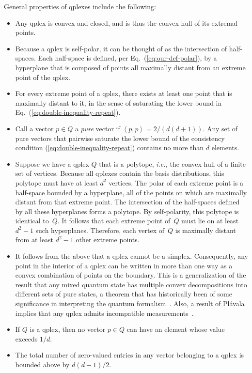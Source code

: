 \documentclass[aps,pra,superscriptaddress,10pt,tightenlines,twocolumn,nofootinbib]{revtex4}
\theoremstyle{remark}
\newcommand{\qp}{Q}
\newcommand{\inprod}[2]{{\left\langle #1 , #2 \right\rangle}}
\begin{document}
General properties of qplexes include the following:
\begin{itemize}
\item Any qplex is convex and closed, and is thus the convex hull of
  its extremal points.

\item Because a qplex is self-polar, it can be thought of as the
  intersection of half-spaces.  Each half-space is defined, per
  Eq.~(\ref{eq:our-def-polar}), by a hyperplane that is composed of
  points all maximally distant from an extreme point of the qplex.

\item For every extreme point of a qplex, there exists at least one
  point that is maximally distant to it, in the sense of saturating
  the lower bound in Eq.~(\ref{eq:double-inequality-repeat}).

\item Call a vector ${p} \in \qp$ a \emph{pure} vector if
  $\inprod{p}{p} = 2/(d(d+1))$.  Any set of pure vectors that pairwise
  saturate the lower bound of the consistency condition
  (\ref{eq:double-inequality-repeat}) contains no more than $d$
  elements.

\item Suppose we have a qplex $\qp$ that is a polytope, \emph{i.e.,} the
  convex hull of a finite set of vertices.  Because all qplexes
  contain the basis distributions, this polytope must have at least
  $d^2$ vertices.  The polar of each extreme point is a half-space
  bounded by a hyperplane, all of the points on which are maximally
  distant from that extreme point.  The intersection of the
  half-spaces defined by all these hyperplanes forms a polytope.  By
  self-polarity, this polytope is identical to~$\qp$.  It follows that
  each extreme point of~$\qp$ must lie on at least $d^2 - 1$ such
  hyperplanes.  Therefore, each vertex of~$\qp$ is maximally distant
  from at least $d^2 - 1$ other extreme points.

\item It follows from the above that a qplex cannot be a simplex.
  Consequently, any point in the interior of a qplex can be written in
  more than one way as a convex combination of points on the boundary.
  This is a generalization of the result that any mixed quantum state
  has multiple convex decompositions into different sets of pure
  states, a theorem that has historically been of some significance in
  interpreting the quantum formalism~\cite{Jaynes1957, Ochs1981,
    CFS2001, stacey-VN}.  Also, a result of Pl\'avala implies that any
  qplex admits incompatible measurements~\cite{Plavala2016}.

\item If $\qp$ is a qplex, then no vector $p \in \qp$ can have an element
  whose value exceeds $1/d$.

\item The total number of zero-valued entries in any vector belonging
  to a qplex is bounded above by $d(d-1)/2$.

\end{itemize}
\end{document}

